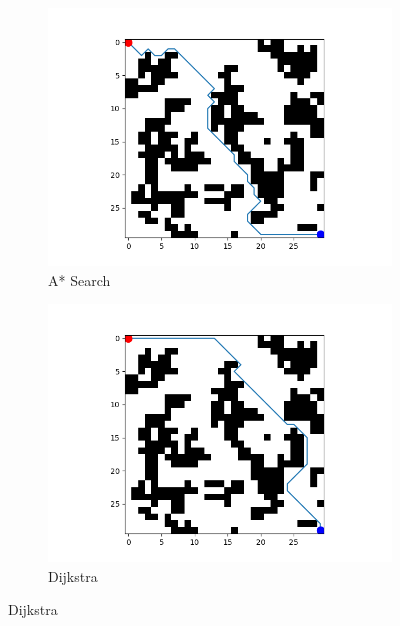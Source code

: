 \documentclass[conference]{IEEEtran}
\begin{document}
\begin{figure}[H]
    \centering
     \begin{subfigure}[b]{0.4\textwidth}
     \centering
         \includegraphics[width=\textwidth]{30x30 grid (A star).png}
         \caption{A* Search}
         \label{fig:x}
     \end{subfigure}
     \hfill
     
     \begin{subfigure}[b]{0.4\textwidth}
     \centering
         \includegraphics[width=\textwidth]{30x30 grid (dijakstra).png}
         \caption{Dijkstra}
         \label{fig:y}
     \end{subfigure}
     

\end{figure}
\end{document}
